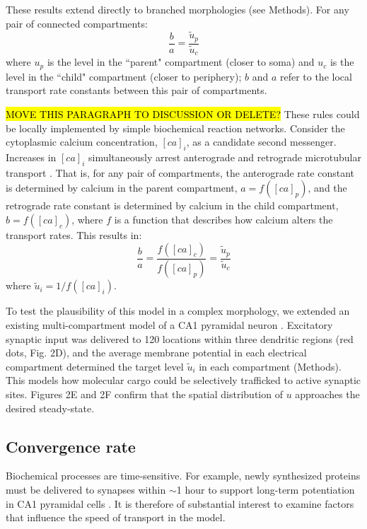 \documentclass[10pt]{wlpeerj}
\begin{document}
These results extend directly to branched morphologies (see Methods). For any pair of connected compartments:
\begin{equation}
\frac{b}{a} = \frac{\tilde{u}_p}{\tilde{u}_c}
\end{equation}
where $u_p$ is the level in the ``parent" compartment (closer to soma) and $u_c$ is the level in the ``child" compartment (closer to periphery); $b$ and $a$ refer to the local transport rate constants between this pair of compartments.


\hl{MOVE THIS PARAGRAPH TO DISCUSSION OR DELETE?} These rules could be locally implemented by simple biochemical reaction networks. Consider the cytoplasmic calcium concentration, $[ca]_i$, as a candidate second messenger. Increases in $[ca]_i$ simultaneously arrest anterograde and retrograde microtubular transport \citep{Wang_2009}. That is, for any pair of compartments, the anterograde rate constant is determined by calcium in the parent compartment, $a = f([ca]_p)$,  and the retrograde rate constant is determined by calcium in the child compartment, $b = f([ca]_c)$, where $f$ is a function that describes how calcium alters the transport rates. This results in:
\begin{equation}
\frac{b}{a} = \frac{f([ca]_c)}{f([ca]_p)} = \frac{\tilde{u}_p}{\tilde{u}_c}
\end{equation}
where $\tilde{u}_i = 1/f([ca]_i)$.


To test the plausibility of this model in a complex morphology, we extended an existing multi-compartment model of a CA1 pyramidal neuron \citep{Migliore_2012}. Excitatory synaptic input was delivered to 120 locations within three dendritic regions (red dots, Fig. 2D), and the average membrane potential in each electrical compartment determined the target level $\tilde{u}_i$ in each compartment (Methods). This models how molecular cargo could be selectively trafficked to active synaptic sites. Figures 2E and 2F confirm that the spatial distribution of $u$ approaches the desired steady-state.

\subsection*{Convergence rate}

Biochemical processes are time-sensitive. For example, newly synthesized proteins must be delivered to synapses within $\sim$1 hour to support long-term potentiation in CA1 pyramidal cells \citep{Frey_1997,Frey_1998}. It is therefore of substantial interest to examine factors that influence the speed of transport in the model.
\end{document}
